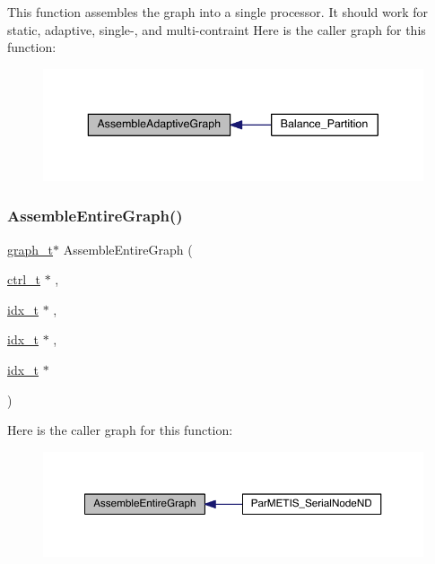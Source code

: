 This function assembles the graph into a single processor. It should work for static, adaptive, single-\/, and multi-\/contraint Here is the caller graph for this function\+:\nopagebreak
\begin{figure}[H]
\begin{center}
\leavevmode
\includegraphics[width=340pt]{a00951_a6ae8e881401699b2182da3976fb68298_icgraph}
\end{center}
\end{figure}
\mbox{\label{a00951_a53356f5a3528e3373e9038eab039259e}} 
\subsubsection{\texorpdfstring{Assemble\+Entire\+Graph()}{AssembleEntireGraph()}}
{\footnotesize\ttfamily \hyperlink{a00734}{graph\+\_\+t}$\ast$ Assemble\+Entire\+Graph (\begin{DoxyParamCaption}\item[{\hyperlink{a00742}{ctrl\+\_\+t} $\ast$}]{,  }\item[{\hyperlink{a00876_aaa5262be3e700770163401acb0150f52}{idx\+\_\+t} $\ast$}]{,  }\item[{\hyperlink{a00876_aaa5262be3e700770163401acb0150f52}{idx\+\_\+t} $\ast$}]{,  }\item[{\hyperlink{a00876_aaa5262be3e700770163401acb0150f52}{idx\+\_\+t} $\ast$}]{ }\end{DoxyParamCaption})}

Here is the caller graph for this function\+:\nopagebreak
\begin{figure}[H]
\begin{center}
\leavevmode
\includegraphics[width=350pt]{a00951_a53356f5a3528e3373e9038eab039259e_icgraph}
\end{center}
\end{figure}
\mbox{\label{a00951_a3350935f0305685a53c03209ace4d6dc}} 
